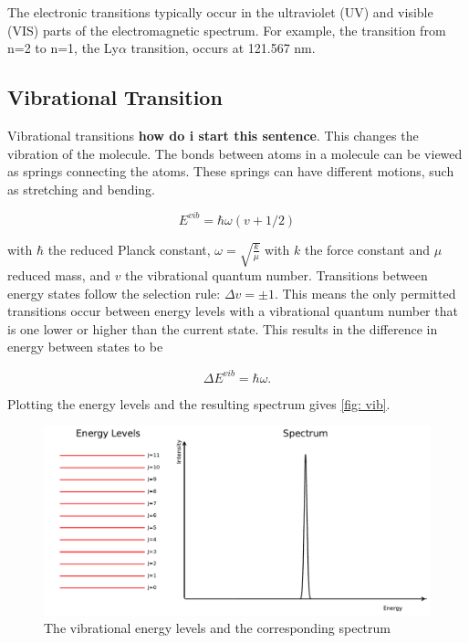 \documentclass[twoside, single, authoryear, semicolon, 12pt]{lion-msc}
\newcommand{\4}{$_4$}
\newcommand{\3}{$_3$}
\newcommand{\2}{$_2$}
\begin{document}
The electronic transitions typically occur in the ultraviolet (UV) and visible (VIS) parts of the electromagnetic spectrum. For example, the transition from n=2 to n=1, the Ly$\alpha$ transition, occurs at 121.567 nm.


\subsection{Vibrational Transition}
Vibrational transitions \textbf{how do i start this sentence}. This changes the vibration of the molecule. The bonds between atoms in a molecule can be viewed as springs connecting the atoms. These springs can have different motions, such as stretching and bending. 

\begin{equation}
    E^{vib}=\hbar\omega(v+1/2)
\end{equation}

with $\hbar$ the reduced Planck constant, $\omega=\sqrt{\frac{k}{\mu}}$ with $k$ the force constant and $\mu$ reduced mass, and $v$ the vibrational quantum number. Transitions between energy states follow the selection rule: $\Delta v=\pm 1$. This means the only permitted transitions occur between energy levels with a vibrational quantum number that is one lower or higher than the current state. This results in the difference in energy between states to be

\begin{equation}
    \Delta E^{vib}=\hbar\omega.
\end{equation}

 Plotting the energy levels and the resulting spectrum gives \autoref{fig: vib}.

\begin{figure}[!ht]
    \centering
    \includegraphics[width=\linewidth]{Figures/VibSpectrum.pdf}
    \caption{The vibrational energy levels and the corresponding spectrum}
    \label{fig: vib}
\end{figure}
\end{document}
